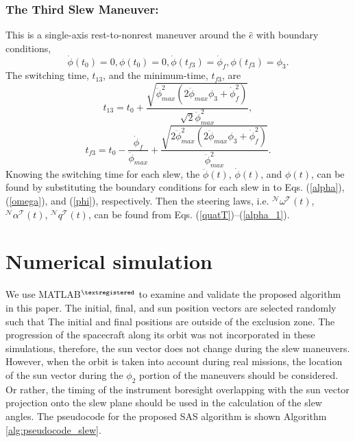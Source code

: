 \documentclass[letterpaper, paper,12pt]{AAS}		%
\begin{document}
	
	
	\subsubsection{The Third Slew Maneuver:}
	 This is a  single-axis rest-to-nonrest maneuver around the $\hat{e}$ with boundary conditions,
	\begin{equation}\label{Bc3}
	\dot{\phi}(t_0)=0,\phi(t_0)=0, \dot{\phi}(t_{f3})=\dot{\phi}_{f},\phi(t_{f3})=\phi_3.
	\end{equation}
	The switching time, $t_{13}$, and the minimum-time, $t_{f3}$, are
	\begin{equation}\label{t31}
	t_{13}=t_0+\frac{\sqrt{\ddot{\phi}_{max}^2(2\ddot{\phi}_{max}\phi_3+\dot{\phi}_{f}^2)}}{\sqrt{2}\ddot{\phi}_{max}^2},
	\end{equation}
	\begin{equation}\label{tf3}
	t_{f3}=t_0-\frac{\dot{\phi}_{f}}{\ddot{\phi}_{max}}+\frac{\sqrt{2\ddot{\phi}_{max}^2(2\ddot{\phi}_{max}\phi_3+\dot{\phi}_{f}^2)}}{\ddot{\phi}_{max}^2}.
	\end{equation}
	Knowing the switching time for each slew, the $\ddot{\phi}(t)$, $\dot{\phi}(t)$, and  $\phi(t)$, can be found by substituting the boundary conditions for each slew in to Eqs. (\ref{alpha}), (\ref{omega}), and (\ref{phi}), respectively. Then the steering laws, i.e. $^\mathcal{N}\omega^\mathcal{T}(t)$, $^\mathcal{N}\alpha^\mathcal{T}(t)$, $^\mathcal{N}q^\mathcal{T}(t)$, can be found from Eqs. (\ref{quatT})--(\ref{alpha_1}).	
\section{Numerical simulation} 
We use  MATLAB$^{\textregistered}$ to examine and validate the proposed algorithm in this paper. The initial, final, and sun position vectors are selected randomly such that The initial and final positions are outside of the exclusion zone. The progression of the spacecraft along its orbit was not incorporated in these simulations, therefore, the sun vector does not change during the slew maneuvers. However, when the orbit is taken into account during real missions, the location of the sun vector during the $\phi_2$ portion of the maneuvers should be considered. Or rather, the timing of the instrument boresight overlapping with the sun vector projection onto the slew plane should be used in the calculation of the slew angles. 
The pseudocode for the proposed SAS algorithm is shown Algorithm \ref{alg:pseudocode_slew}.   
	
\end{document}
